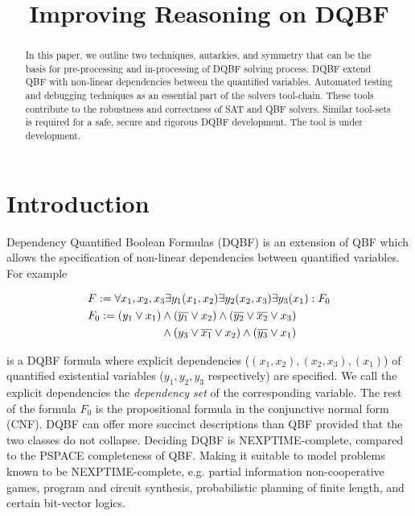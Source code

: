 \documentclass[conference]{IEEEtran}
\begin{document}
\title{Improving Reasoning on DQBF}


\author{
}

\maketitle

\begin{abstract}
In this paper, we outline two techniques, autarkies, and symmetry that
can be the basis for pre-processing and in-processing of DQBF solving process.
%
DQBF extend QBF with non-linear dependencies between the quantified variables.
%
Automated testing and debugging techniques as an essential part of the solvers tool-chain.
%
These tools contribute to the robustness and correctness of SAT and QBF solvers.
%
Similar tool-sets is required for a safe, secure and rigorous DQBF development.
%
The tool is under development.   
\end{abstract}



\section{Introduction}
\label{sec:Intro}
Dependency Quantified Boolean Formulas (DQBF) is an extension of QBF
which allows the specification of non-linear dependencies between quantified variables. 
%
For example \par\noindent
\begin{equation}
\begin{split}
&F := \forall x_1,x_2,x_3 \exists y_1(x_1,x_2) \exists y_2(x_2,x_3) \exists y_3(x_1): F_0 \\
&F_0 := (y_1 \vee x_1) \wedge (\overline{y_1} \vee x_2) \wedge (\overline{y_2} \vee \overline{x_2} \vee x_3) \\
&\hspace{2.3cm}\wedge (y_3 \vee \overline{x_1} \vee x_2) \wedge (\overline{y_3} \vee x_1)
\end{split}
\label{eqn:ex}
\end{equation}

is a DQBF formula where explicit dependencies ($(x_1,x_2), (x_2,x_3), (x_1)$) of quantified existential variables ($y_1, y_2, y_3$ respectively) are specified. We call the explicit dependencies the \textit{dependency set} of the corresponding variable. 
%
The rest of the formula $F_0$ is the propositional formula in the conjunctive normal form (CNF).
%
DQBF can offer more succinct descriptions than
QBF provided that the two classes do not collapse.
%
Deciding DQBF is NEXPTIME-complete, compared to the PSPACE completeness of QBF.
%
Making it suitable to model problems known to be NEXPTIME-complete, e.g. partial information non-cooperative games, program and circuit synthesis, probabilistic planning of finite length, and certain bit-vector logics.
\end{document}
